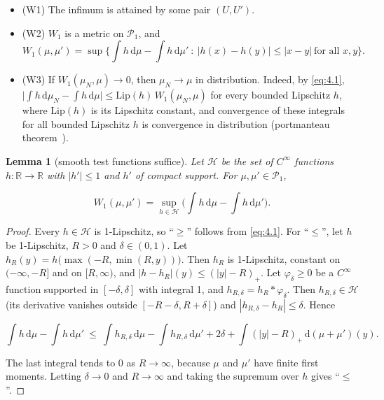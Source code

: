 \documentclass[aip,jmp,preprint,onecolumn,floatfix,superscriptaddress,nofootinbib,11pt]{revtex4-2}
\theoremstyle{plain}
\newtheorem{lemma}{Lemma}
\theoremstyle{remark}
\numberwithin{equation}{section}
\newcommand{\dd}{\mathrm{d}}
\begin{document}
\begin{itemize}
\item (W1) The infimum is attained by some pair $(U,U')$.
\item (W2) $W_1$ is a metric on $\mathcal P_1$, and
\begin{equation}
W_1(\mu,\mu')=\sup\Big\{\int h\,\dd\mu-\int h\,\dd\mu'\ :\ |h(x)-h(y)|\le|x-y|\ \text{for all }x,y\Big\}.
\label{eq:4.1}
\end{equation}

\item (W3) If $W_1(\mu_N,\mu)\to0$, then $\mu_N\to\mu$ in distribution. Indeed, by \eqref{eq:4.1}, $\big|\int h\,\dd\mu_N-\int h\,\dd\mu\big|\le \mathrm{Lip}(h)\,W_1(\mu_N,\mu)$ for every bounded Lipschitz $h$, where $\mathrm{Lip}(h)$ is its Lipschitz constant, and convergence of these integrals for all bounded Lipschitz $h$ is convergence in distribution (portmanteau theorem~\cite{Billingsley}).
\end{itemize}

\begin{lemma}[smooth test functions suffice]

Let $\mathcal H$ be the set of $C^\infty$ functions $h:\mathbb R\to\mathbb R$ with $|h'|\le1$ and $h'$ of compact support. For $\mu,\mu'\in\mathcal P_1$,

\begin{equation*}
W_1(\mu,\mu')=\sup_{h\in\mathcal H}\Big(\int h\,\dd\mu-\int h\,\dd\mu'\Big).
\end{equation*}

\end{lemma}

\begin{proof} Every $h\in\mathcal H$ is 1-Lipschitz, so ``$\ge$'' follows from \eqref{eq:4.1}. For ``$\le$'', let $h$ be 1-Lipschitz, $R>0$ and $\delta\in(0,1)$. Let $h_R(y)=h\big(\max(-R,\min(R,y))\big)$. Then $h_R$ is 1-Lipschitz, constant on $(-\infty,-R]$ and on $[R,\infty)$, and $|h-h_R|(y)\le(|y|-R)_+$. Let $\varphi_\delta\ge0$ be a $C^\infty$ function supported in $[-\delta,\delta]$ with integral 1, and $h_{R,\delta}=h_R*\varphi_\delta$. Then $h_{R,\delta}\in\mathcal H$ (its derivative vanishes outside $[-R-\delta,R+\delta]$) and $|h_{R,\delta}-h_R|\le\delta$. Hence

\begin{equation*}
\int h\,\dd\mu-\int h\,\dd\mu'\ \le\ \int h_{R,\delta}\,\dd\mu-\int h_{R,\delta}\,\dd\mu'+2\delta+\int(|y|-R)_+\,\dd(\mu+\mu')(y).
\end{equation*}

The last integral tends to $0$ as $R\to\infty$, because $\mu$ and $\mu'$ have finite first moments. Letting $\delta\to0$ and $R\to\infty$ and taking the supremum over $h$ gives ``$\le$''. 
\end{proof}
\end{document}
